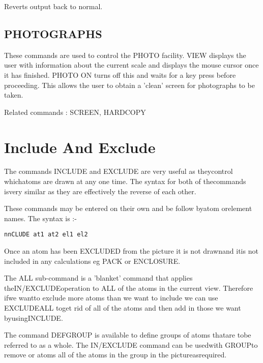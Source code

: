 \documentclass[10pt,a4paper]{report}
\begin{document}
Reverts output back to normal.
\section{PHOTOGRAPHS}


\bigskip{}




\bigskip{}


\bigskip{}
These commands are used to control the PHOTO facility. VIEW displays the
user with information about the current scale and displays the mouse
cursor once it has finished. PHOTO ON turns off this and waits for a key
press before proceeding. This allows the user to obtain a 'clean' screen
for photographs to be taken.


Related commands : SCREEN, HARDCOPY
\chapter{Include And Exclude}

The commands INCLUDE and EXCLUDE are very useful as theycontrol whichatoms are drawn at any one time. The syntax for both of thecommands isvery similar as they are effectively the reverse of each other.

\bigskip{}



\bigskip{}



These commands may be entered on their own and be follow byatom orelement names. The syntax is :-\small\begin{verbatim}nnCLUDE at1 at2 el1 el2\end{verbatim}\normalsize

Once an atom has been EXCLUDED from the picture it is not drawnand itis not included in any calculations eg PACK or ENCLOSURE.

\bigskip{}The ALL sub-command is a 'blanket' command that applies theIN/EXCLUDEoperation to ALL of the atoms in the current view. Therefore ifwe wantto exclude more atoms than we want to include we can use EXCLUDEALL toget rid of all of the atoms and then add in those we want byusingINCLUDE.

\bigskip{}The command DEFGROUP is available to define groups of atoms thatare tobe referred to as a whole. The IN/EXCLUDE command can be usedwith GROUPto remove or atoms all of the atoms in the group in the pictureasrequired.
\end{document}
